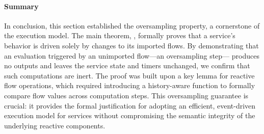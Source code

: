 \paragraph{Summary}
In conclusion, this section established the oversampling property, a cornerstone of the \GRust
execution model. The main theorem, , formally proves
that a service's behavior is driven solely by changes to its imported flows.
%
By demonstrating that an evaluation triggered by an unimported flow---an oversampling step---%
produces no outputs and leaves the service state and timers unchanged, we confirm that such
computations are inert.
%
The proof was built upon a key lemma for reactive flow operations, which required introducing a
history-aware  function to formally compare flow values across computation steps.
%
This oversampling guarantee is crucial: it provides the formal justification for adopting an
efficient, event-driven execution model for services without compromising the semantic integrity of
the underlying reactive components.
